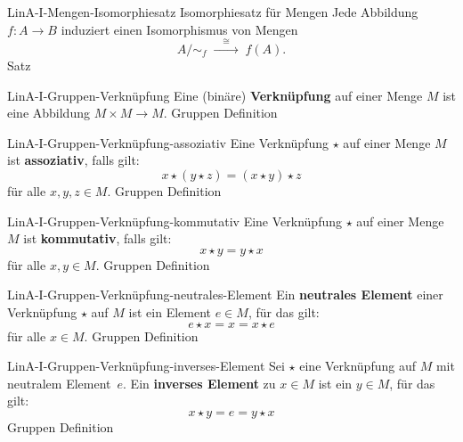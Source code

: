 \documentclass[10pt]{article}
\begin{document}
\begin{note}{LinA-I-Mengen-Isomorphiesatz}
\field Isomorphiesatz für Mengen
\field
    Jede Abbildung \(f\colon A\longrightarrow B\) induziert einen Isomorphismus von Mengen
    \[
      A/\!\sim_f \;\xrightarrow{\quad\cong\quad}\; f(A).
    \]
    \clend
    \field
    \field Satz
\end{note}


\begin{note}{LinA-I-Gruppen-Verknüpfung}
  \field
  \field
  Eine (binäre) \textbf{Verknüpfung} auf einer Menge \(M\) ist eine Abbildung \(M\times M\to M\).\clend
  \field
  \field Gruppen
  \field Definition
\end{note}

\begin{note}{LinA-I-Gruppen-Verknüpfung-assoziativ}
  \field
  \field
  Eine Verknüpfung \(\star\) auf einer Menge \(M\) ist \textbf{assoziativ}, falls gilt:
  \[
    x\star(y\star z) = (x\star y)\star z
  \]
  für alle \(x,y,z \in M\).
  \clend
  \field
  \field Gruppen
  \field Definition
\end{note}

\begin{note}{LinA-I-Gruppen-Verknüpfung-kommutativ}
  \field
  \field
  Eine Verknüpfung \(\star\) auf einer Menge \(M\) ist \textbf{kommutativ}, falls gilt:
  \[
    x\star y = y\star x
  \]
  für alle \(x,y \in M\).
  \clend
  \field
  \field Gruppen
  \field Definition
\end{note}

\begin{note}{LinA-I-Gruppen-Verknüpfung-neutrales-Element}
  \field
  \field
  Ein \textbf{neutrales Element} einer Verknüpfung \(\star\) auf \(M\) ist ein Element \(e\in M\), für das gilt:
  \[
    e\star x = x = x\star e
  \]
  für alle \(x\in M\).
  \clend
  \field
  \field Gruppen
  \field Definition
\end{note}

\begin{note}{LinA-I-Gruppen-Verknüpfung-inverses-Element}
  \field
  \field
  Sei \(\star\) eine Verknüpfung auf \(M\) mit neutralem Element~\(e\). 
  Ein \textbf{inverses Element} zu \(x\in M\) ist ein \(y\in M\), für das gilt:
  \[
    x\star y = e = y\star x
  \]
  \clend
  \field
  \field Gruppen
  \field Definition  
\end{note}
\end{document}
